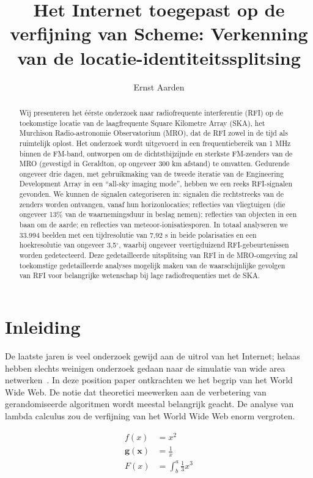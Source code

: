 \documentclass{hogent-article}
\title{Het Internet toegepast op de verfijning van Scheme: Verkenning van de locatie-identiteitssplitsing}
\author{Ernst Aarden}
\begin{document}
\begin{abstract}
  Wij presenteren het éérste onderzoek naar radiofrequente interferentie (RFI) op de toekomstige locatie van de laagfrequente Square Kilometre Array (SKA), het Murchison Radio-astronomie Observatorium (MRO), dat de RFI zowel in de tijd als ruimtelijk oplost.  Het onderzoek wordt uitgevoerd in een frequentiebereik van 1 MHz binnen de FM-band, ontworpen om de dichtstbijzijnde en sterkste FM-zenders van de MRO (gevestigd in Geraldton, op ongeveer 300 km afstand) te omvatten.  Gedurende ongeveer drie dagen, met gebruikmaking van de tweede iteratie van de Engineering Development Array in een ``all-sky imaging mode'', hebben we een reeks RFI-signalen gevonden.  We kunnen de signalen categoriseren in: signalen die rechtstreeks van de zenders worden ontvangen, vanaf hun horizonlocaties; reflecties van vliegtuigen (die ongeveer 13\% van de waarnemingsduur in beslag nemen); reflecties van objecten in een baan om de aarde; en reflecties van meteoor-ionisatiesporen.  In totaal analyseren we 33.994 beelden met een tijdresolutie van 7,92 s in beide polarisaties en een hoekresolutie van ongeveer 3,5$^{\circ}$, waarbij ongeveer veertigduizend RFI-gebeurtenissen worden gedetecteerd.  Deze gedetailleerde uitsplitsing van RFI in de MRO-omgeving zal toekomstige gedetailleerde analyses mogelijk maken van de waarschijnlijke gevolgen van RFI voor belangrijke wetenschap bij lage radiofrequenties met de SKA.
\end{abstract}

\tableofcontents

\section{Inleiding}%
\label{sec:inleiding}

De laatste jaren is veel onderzoek gewijd aan de uitrol van het Internet; helaas hebben slechts weinigen onderzoek gedaan naar de simulatie van wide area netwerken~\autocite{Hykes2013}. In deze position paper ont\-krach\-ten we het begrip van het World Wide Web. De notie dat theoretici meewerken aan de verbetering van gerandomiseerde algoritmen wordt meestal belangrijk geacht. De analyse van lambda calculus zou de verfijning van het World Wide Web enorm vergroten.

\begin{align*}
  f(x) &= x^2\\
  \mathbf{ g(x) } &= \frac{1}{x}\\
   F(x)  &= \int^a_b \frac{1}{3}x^3\\
\end{align*}
\end{document}
